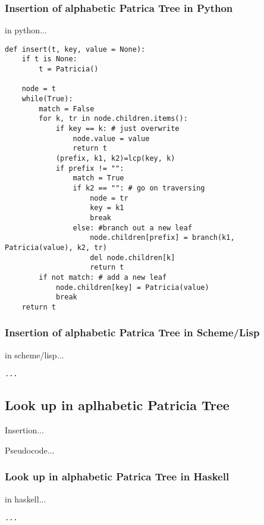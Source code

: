 \documentclass{article}
\begin{document}
\subsubsection*{Insertion of alphabetic Patrica Tree in Python}
in python...

\lstset{language=Python}
\begin{lstlisting}
def insert(t, key, value = None):
    if t is None:
        t = Patricia()

    node = t
    while(True):
        match = False
        for k, tr in node.children.items():
            if key == k: # just overwrite
                node.value = value
                return t
            (prefix, k1, k2)=lcp(key, k)
            if prefix != "":
                match = True
                if k2 == "": # go on traversing
                    node = tr
                    key = k1
                    break
                else: #branch out a new leaf
                    node.children[prefix] = branch(k1, Patricia(value), k2, tr)
                    del node.children[k]
                    return t
        if not match: # add a new leaf
            node.children[key] = Patricia(value)
            break
    return t
\end{lstlisting}

\subsubsection*{Insertion of alphabetic Patrica Tree in Scheme/Lisp}
in scheme/lisp...

\lstset{language=lisp}
\begin{lstlisting}
...
\end{lstlisting}

\subsection{Look up in aplhabetic Patricia Tree}
Insertion...

Pseudocode...

\subsubsection*{Look up in alphabetic Patrica Tree in Haskell}
in haskell...

\lstset{language=Haskell}
\begin{lstlisting}
...
\end{lstlisting}
\end{document}
